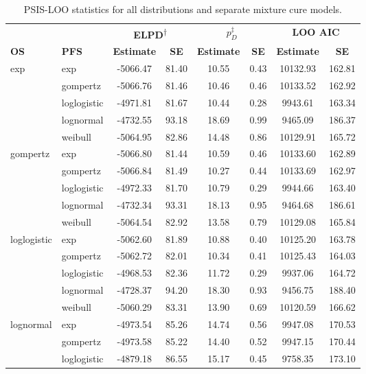 \documentclass[AMA,STIX1COL]{WileyNJD-v2}
\begin{document}
\begin{table}[H]
\caption{PSIS-LOO statistics for all distributions and separate mixture cure models. \label{tab:loo_separate}}
\centering
\begin{tabular}{l l c c c c c c}
\toprule
\multicolumn{1}{l}{} & \multicolumn{1}{l}{} & \multicolumn{2}{c}{\textbf{ELPD\textsuperscript{$\dagger$}}} & \multicolumn{2}{c}{\textbf{$p_D^{\ddagger}$}} & \multicolumn{2}{c}{\textbf{LOO AIC}} \\
\cmidrule{3-4}\cmidrule{5-6}\cmidrule{7-8}
\textbf{OS} & \textbf{PFS} & \textbf{Estimate} & \textbf{SE} & \textbf{Estimate} & \textbf{SE} & \textbf{Estimate} & \textbf{SE}\\
\midrule
exp & exp & -5066.47 & 81.40 & 10.55 & 0.43 & 10132.93 & 162.81\\
 & gompertz & -5066.76 & 81.46 & 10.46 & 0.46 & 10133.52 & 162.92\\
 & loglogistic & -4971.81 & 81.67 & 10.44 & 0.28 & 9943.61 & 163.34\\
 & lognormal & -4732.55 & 93.18 & 18.69 & 0.99 & 9465.09 & 186.37\\
 & weibull & -5064.95 & 82.86 & 14.48 & 0.86 & 10129.91 & 165.72\\
gompertz & exp & -5066.80 & 81.44 & 10.59 & 0.46 & 10133.60 & 162.89\\
 & gompertz & -5066.84 & 81.49 & 10.27 & 0.44 & 10133.69 & 162.97\\
 & loglogistic & -4972.33 & 81.70 & 10.79 & 0.29 & 9944.66 & 163.40\\
 & lognormal & -4732.34 & 93.31 & 18.13 & 0.95 & 9464.68 & 186.61\\
 & weibull & -5064.54 & 82.92 & 13.58 & 0.79 & 10129.08 & 165.84\\
loglogistic & exp & -5062.60 & 81.89 & 10.88 & 0.40 & 10125.20 & 163.78\\
 & gompertz & -5062.72 & 82.01 & 10.34 & 0.41 & 10125.43 & 164.03\\
 & loglogistic & -4968.53 & 82.36 & 11.72 & 0.29 & 9937.06 & 164.72\\
 & lognormal & -4728.37 & 94.20 & 18.30 & 0.93 & 9456.75 & 188.40\\
 & weibull & -5060.29 & 83.31 & 13.90 & 0.69 & 10120.59 & 166.62\\
lognormal & exp & -4973.54 & 85.26 & 14.74 & 0.56 & 9947.08 & 170.53\\
 & gompertz & -4973.58 & 85.22 & 14.40 & 0.52 & 9947.15 & 170.44\\
 & loglogistic & -4879.18 & 86.55 & 15.17 & 0.45 & 9758.35 & 173.10\\

\end{tabular}
\end{table}
\end{document}
